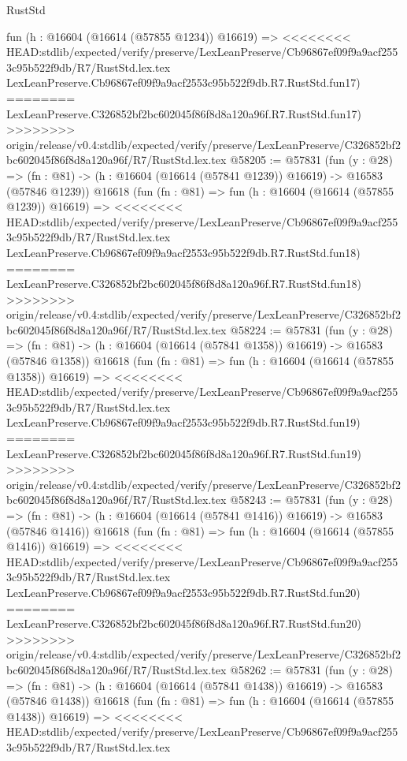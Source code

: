 \begin{lexlean}{RustStd}
\begin{coremodule}
{\begin{coremodule}
{{{{{{{{{{{{{{{{{{{{{{{{{{{{{{{{{{{{{{{{{{{{{{{{{{{{{{{    fun (h : @16604 (@16614 (@57855 @1234)) @16619) =>
<<<<<<<< HEAD:stdlib/expected/verify/preserve/LexLeanPreserve/Cb96867ef09f9a9acf2553c95b522f9db/R7/RustStd.lex.tex
    LexLeanPreserve.Cb96867ef09f9a9acf2553c95b522f9db.R7.RustStd.fun17)
========
    LexLeanPreserve.C326852bf2bc602045f86f8d8a120a96f.R7.RustStd.fun17)
>>>>>>>> origin/release/v0.4:stdlib/expected/verify/preserve/LexLeanPreserve/C326852bf2bc602045f86f8d8a120a96f/R7/RustStd.lex.tex
@58205 := @57831
    (fun (y : @28) =>
    (fn : @81) -> (h : @16604 (@16614 (@57841 @1239)) @16619) -> @16583 (@57846 @1239))
    @16618
    (fun (fn : @81) =>
    fun (h : @16604 (@16614 (@57855 @1239)) @16619) =>
<<<<<<<< HEAD:stdlib/expected/verify/preserve/LexLeanPreserve/Cb96867ef09f9a9acf2553c95b522f9db/R7/RustStd.lex.tex
    LexLeanPreserve.Cb96867ef09f9a9acf2553c95b522f9db.R7.RustStd.fun18)
========
    LexLeanPreserve.C326852bf2bc602045f86f8d8a120a96f.R7.RustStd.fun18)
>>>>>>>> origin/release/v0.4:stdlib/expected/verify/preserve/LexLeanPreserve/C326852bf2bc602045f86f8d8a120a96f/R7/RustStd.lex.tex
@58224 := @57831
    (fun (y : @28) =>
    (fn : @81) -> (h : @16604 (@16614 (@57841 @1358)) @16619) -> @16583 (@57846 @1358))
    @16618
    (fun (fn : @81) =>
    fun (h : @16604 (@16614 (@57855 @1358)) @16619) =>
<<<<<<<< HEAD:stdlib/expected/verify/preserve/LexLeanPreserve/Cb96867ef09f9a9acf2553c95b522f9db/R7/RustStd.lex.tex
    LexLeanPreserve.Cb96867ef09f9a9acf2553c95b522f9db.R7.RustStd.fun19)
========
    LexLeanPreserve.C326852bf2bc602045f86f8d8a120a96f.R7.RustStd.fun19)
>>>>>>>> origin/release/v0.4:stdlib/expected/verify/preserve/LexLeanPreserve/C326852bf2bc602045f86f8d8a120a96f/R7/RustStd.lex.tex
@58243 := @57831
    (fun (y : @28) =>
    (fn : @81) -> (h : @16604 (@16614 (@57841 @1416)) @16619) -> @16583 (@57846 @1416))
    @16618
    (fun (fn : @81) =>
    fun (h : @16604 (@16614 (@57855 @1416)) @16619) =>
<<<<<<<< HEAD:stdlib/expected/verify/preserve/LexLeanPreserve/Cb96867ef09f9a9acf2553c95b522f9db/R7/RustStd.lex.tex
    LexLeanPreserve.Cb96867ef09f9a9acf2553c95b522f9db.R7.RustStd.fun20)
========
    LexLeanPreserve.C326852bf2bc602045f86f8d8a120a96f.R7.RustStd.fun20)
>>>>>>>> origin/release/v0.4:stdlib/expected/verify/preserve/LexLeanPreserve/C326852bf2bc602045f86f8d8a120a96f/R7/RustStd.lex.tex
@58262 := @57831
    (fun (y : @28) =>
    (fn : @81) -> (h : @16604 (@16614 (@57841 @1438)) @16619) -> @16583 (@57846 @1438))
    @16618
    (fun (fn : @81) =>
    fun (h : @16604 (@16614 (@57855 @1438)) @16619) =>
<<<<<<<< HEAD:stdlib/expected/verify/preserve/LexLeanPreserve/Cb96867ef09f9a9acf2553c95b522f9db/R7/RustStd.lex.tex
}}}}}}}}}}}}}}}}}}}}}}}}}}}}}}}}}}}}}}}}}}}}}}}}}}}}}}}
\end{coremodule}}
\end{coremodule}
\end{lexlean}

